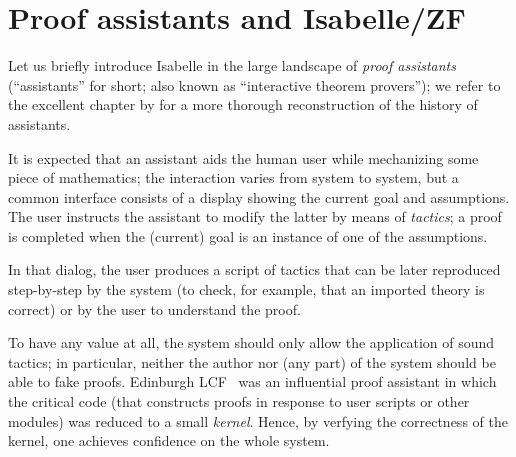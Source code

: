 \section{Proof assistants and Isabelle/ZF}
\label{sec:proof-assist-isabelle}

Let us briefly introduce Isabelle \cite{DBLP:books/sp/Paulson94} in the large landscape of \emph{proof
assistants} (“assistants” for short; also known as “interactive theorem provers”); we refer to the
excellent chapter by \citet{DBLP:series/hhl/HarrisonUW14} for a more
thorough reconstruction of the history of assistants.

It is expected that an assistant aids the human user while mechanizing
some piece of mathematics; the interaction varies from system to
system, but a common interface consists of a display showing the
current goal and assumptions. The user instructs the assistant to modify the
latter by means of \emph{tactics}; a %
proof is completed when the (current) goal is an instance of one of
the assumptions.

In that dialog, the user produces a script of tactics that can be
later reproduced step-by-step by the system (to check, for example,
that an imported theory is correct) or by the user to understand
the proof.

To have any value at all, the system should only allow the application
of sound tactics; in particular, neither the author nor (any part) of
the system should be able to fake proofs. Edinburgh LCF~\cite{Gordon1979-qm} was an
influential proof assistant in which the critical code (that
constructs proofs in response to user scripts or other modules) was reduced to a small
\emph{kernel}. Hence, by verfying the correctness of the kernel, one
achieves confidence on the whole system.

